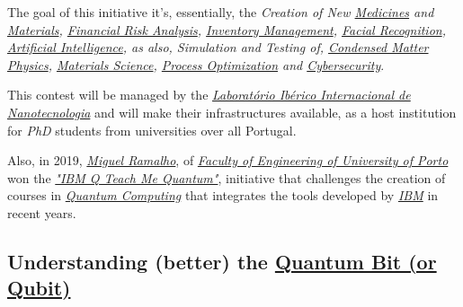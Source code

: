 \documentclass[conference]{IEEEtran}
\begin{document}
\vspace{4pt}

The goal of this initiative it's, essentially, the \textit{Creation of New \href{https://en.wikipedia.org/wiki/Medication}{Medicines} and \href{https://en.wikipedia.org/wiki/Materials_science}{Materials}, \href{https://en.wikipedia.org/wiki/Financial_risk_management}{Financial Risk Analysis}, \href{https://en.wikipedia.org/wiki/Inventory}{Inventory Management}, \href{https://en.wikipedia.org/wiki/Facial_recognition_system}{Facial Recognition}, \href{https://en.wikipedia.org/wiki/Artificial_intelligence}{Artificial Intelligence}, as also, Simulation and Testing of, \href{https://en.wikipedia.org/wiki/Condensed_matter_physics}{Condensed Matter Physics}, \href{https://en.wikipedia.org/wiki/Materials_science}{Materials Science}, \href{https://en.wikipedia.org/wiki/Process_optimization}{Process Optimization} and \href{https://en.wikipedia.org/wiki/Computer_security}{Cybersecurity}}.

\vspace{4pt}

This contest will be managed by the \href{https://inl.int/}{\textit{Laborat\'orio Ib\'erico Internacional de Nanotecnologia}} and will make their infrastructures available, as a host institution for \textit{PhD} students from universities over all Portugal.

\vspace{4pt}

Also, in 2019, \href{https://noticias.up.pt/estudante-feup-vence-premio-internacional-em-computacao-quantica/}{\textit{Miguel Ramalho}}, of \href{https://sigarra.up.pt/feup/pt/web_page.inicial}{\textit{Faculty of Engineering of University of Porto}} won the \href{https://www.ibm.com/blogs/research/2019/01/ibmq-teach-quantum-winners/}{\textit{"IBM Q Teach Me Quantum"}}, initiative that challenges the creation of courses in \href{https://en.wikipedia.org/wiki/Quantum_computing}{\textit{Quantum Computing}} that integrates the tools developed by \href{https://en.wikipedia.org/wiki/IBM}{\textit{IBM}} in recent years.

\vspace{6pt}

\subsection{Understanding (better) the \href{https://en.wikipedia.org/wiki/Qubit}{Quantum Bit (or Qubit)}}\label{AA}

\vspace{4pt}
\end{document}
